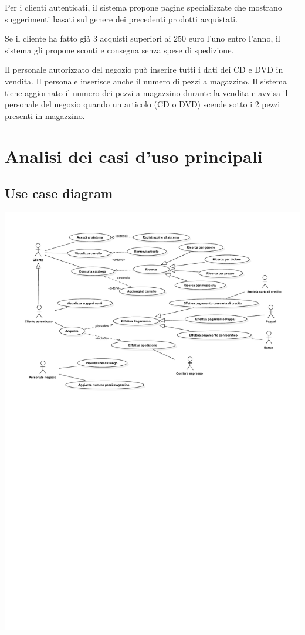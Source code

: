 \documentclass{article}
\begin{document}
Per i clienti autenticati, il sistema propone pagine specializzate che mostrano suggerimenti basati sul
genere dei precedenti prodotti acquistati.

Se il cliente ha fatto già 3 acquisti superiori ai 250 euro l’uno entro l’anno, il sistema gli propone sconti e
consegna senza spese di spedizione.

Il personale autorizzato del negozio può inserire tutti i dati dei CD e DVD in vendita. Il personale
inserisce anche il numero di pezzi a magazzino. Il sistema tiene aggiornato il numero dei pezzi a
magazzino durante la vendita e avvisa il personale del negozio quando un articolo (CD o DVD) scende
sotto i 2 pezzi presenti in magazzino.	

\section{Analisi dei casi d'uso principali}
\subsection{Use case diagram}
\begin{center}
\includegraphics[clip, trim=0.5cm 16cm 0.5cm 0cm, width=1.0\textwidth]{use-case-diagram.pdf}
\end{center}
\end{document}
